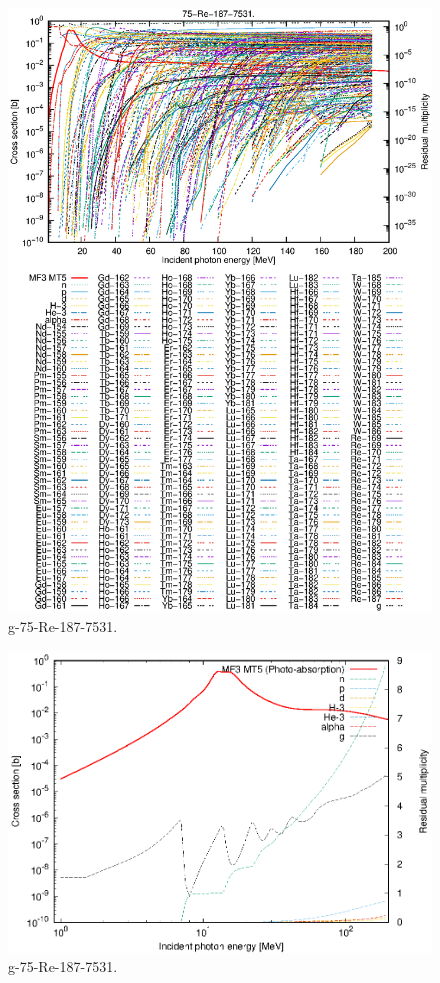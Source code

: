 \begin{figure}
 \includegraphics[width=\linewidth]{eps/g_75-Re-187_7531.eps}
  \caption{g-75-Re-187-7531.}
\end{figure}
\newpage \clearpage

\begin{figure}
 \includegraphics[width=\linewidth]{eps-log/g_75-Re-187_7531.eps}
 \caption{g-75-Re-187-7531.}
\end{figure}
\newpage \clearpage

